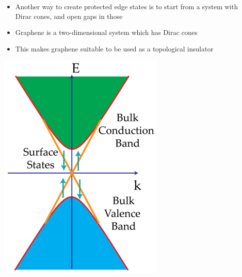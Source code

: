 \documentclass[12pt]{article}
\numberwithin{equation}{section}
\begin{document}
\begin{minipage}[c]{0.45\textwidth}
  \begin{itemize}
    \item Another way to create protected edge states is to start from a system with Dirac cones, and open gaps in those
    \item Graphene is a two-dimensional system which has Dirac cones
    \item This makes graphene suitable to be used as a topological insulator
  \end{itemize}
\end{minipage}
\hfill
\begin{minipage}[c]{0.45\textwidth}
  \includegraphics[height=0.75\textheight]{./media/TI-band-structure.png}
\end{minipage}
\end{document}
